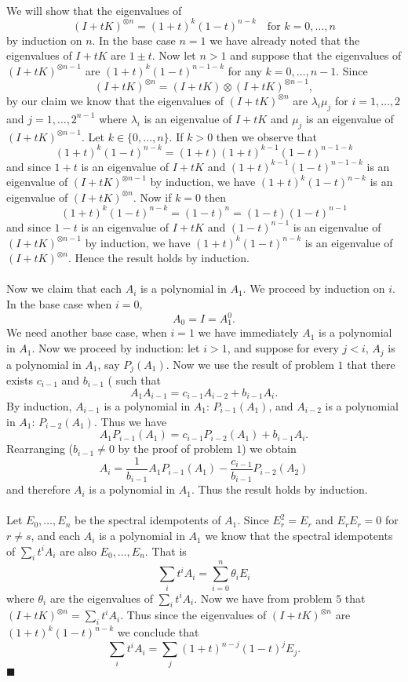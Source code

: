 \documentclass[letterpaper,12pt,oneside,onecolumn]{article}
\newcommand{\1}{\mathbbm{1}}
\begin{document}
\paragraph{}
We will show that the eigenvalues of
$$(I + tK)^{\otimes n} = (1+t)^k(1-t)^{n-k} \quad\text{for $k = 0,\dots, n$}$$
by induction on $n$. In the base case $n=1$ we have already noted that the eigenvalues of $I+tK$ are $1 \pm t$. Now let $n > 1$ and suppose that the eigenvalues of $(I+tK)^{\otimes n-1}$ are $(1+t)^k(1-t)^{n-1-k}$ for any $k =0, \dots, n-1$. Since
$$(I + tK)^{\otimes n} = (I+tK) \otimes (I+tK)^{\otimes n-1},$$
by our claim we know that the eigenvalues of $(I+tK)^{\otimes n}$ are $\lambda_i \mu_j$ for $i = 1, \dots, 2$ and $j = 1,\dots, 2^{n-1}$ where $\lambda_i$ is an eigenvalue of $I+tK$ and $\mu_j$ is an eigenvalue of $(I+tK)^{\otimes n-1}$. Let $k \in \{ 0, \dots, n\}$. If $k >0$ then we observe that
$$(1+t)^k(1-t)^{n-k} = (1+t)(1+t)^{k-1}(1-t)^{n-1-k}$$
and since $1+t$ is an eigenvalue of $I+tK$ and $(1+t)^{k-1}(1-t)^{n-1-k}$ is an eigenvalue of $(I+tK)^{\otimes n-1}$ by induction, we have $(1+t)^k(1-t)^{n-k}$ is an eigenvalue of $(I+tK)^{\otimes n}$. Now if $k = 0$ then
$$(1+t)^k(1-t)^{n-k} = (1-t)^{n} = (1-t)(1-t)^{n-1}$$
and since $1-t$ is an eigenvalue of $I+tK$ and $(1-t)^{n-1}$ is an eigenvalue of $(I+tK)^{\otimes n-1}$ by induction, we have $(1+t)^k(1-t)^{n-k}$ is an eigenvalue of $(I+tK)^{\otimes n}$. Hence the result holds by induction.
\paragraph{}
Now we claim that each $A_i$ is a polynomial in $A_1$. We proceed by induction on $i$. In the base case when $i=0$,
$$A_0 = I = A_1^0.$$
We need another base case, when $i=1$ we have immediately $A_1$ is a polynomial in $A_1$.
Now we proceed by induction: let $i > 1$, and suppose for every $j < i$, $A_j$ is a polynomial in $A_1$, say $P_j(A_1)$. Now we use the result of problem $1$ that there exists $c_{i-1}$ and $b_{i-1}$ ( such that
$$A_1A_{i-1} = c_{i-1}A_{i-2} + b_{i-1}A_i.$$
By induction, $A_{i-1}$ is a polynomial in $A_1$: $P_{i-1}(A_1)$, and $A_{i-2}$ is a polynomial in $A_1$: $P_{i-2}(A_1)$. Thus we have
$$A_1P_{i-1}(A_1) = c_{i-1}P_{i-2}(A_1) + b_{i-1}A_i.$$
Rearranging ($b_{i-1} \neq 0$ by the proof of problem $1$) we obtain
$$A_i = \frac{1}{b_{i-1}}A_1P_{i-1}(A_1) - \frac{c_{i-1}}{b_{i-1}}P_{i-2}(A_2)$$
and therefore $A_i$ is a polynomial in $A_1$. Thus the result holds by induction. 
\paragraph{}
Let $E_0, \dots, E_n$ be the spectral idempotents of $A_1$. Since $E_r^2 = E_r$ and $E_rE_r = 0$ for $r\neq s$, and each $A_i$ is a polynomial in $A_1$ we know that the spectral idempotents of $\sum_i t^i A_i$ are also $E_0, \dots, E_n$. That is 
$$\sum_i t^i A_i = \sum_{i=0}^n \theta_i E_i$$
where $\theta_i$ are the eigenvalues of $\sum_{i}t^i A_i$. Now we have from problem $5$ that $(I+tK)^{\otimes n} =\sum_i  t^i A_i$. Thus since the eigenvalues of $(I+tK)^{\otimes n}$ are $(1+t)^k(1-t)^{n-k}$ we conclude that
$$\sum_i t^i A_i = \sum_j(1+t)^{n-j}(1-t)^j E_j.$$
$\blacksquare$
\end{document}

